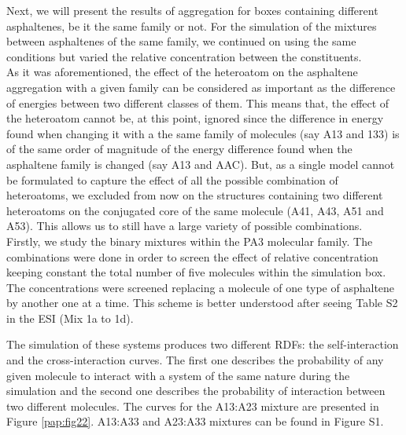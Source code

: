 Next, we will present the results of aggregation for boxes containing different asphaltenes, be it the same family or not. For the simulation of the mixtures between asphaltenes of the same family, we continued on using the same conditions but varied the relative concentration between the constituents.\\

As it was aforementioned, the effect of the heteroatom on the asphaltene aggregation with a given family can be considered as important as the difference of energies between two different classes of them. This means that, the effect of the heteroatom cannot be, at this point, ignored since the difference in energy found when changing it with a the same family of molecules (say A13 and 133) is of the same order of magnitude of the energy difference found when the asphaltene family is changed (say A13 and AAC). But, as a single model cannot be formulated to capture the effect of all the possible combination of heteroatoms, we excluded from now on the structures containing two different heteroatoms on the conjugated core of the same molecule (A41, A43, A51 and A53). This allows us to still have a large variety of possible combinations.\\

Firstly, we study the binary mixtures within the PA3 molecular family. The combinations were done in order to screen the effect of relative concentration keeping constant the total number of five molecules within the simulation box. The concentrations were screened replacing a molecule of one type of asphaltene by another one at a time. This scheme is better understood after seeing Table S2 in the ESI (Mix 1a to 1d).

The simulation of these systems produces two different RDFs: the self-interaction and the cross-interaction curves. The first one describes the probability of any given molecule to interact with a system of the same nature during the simulation and the second one describes the probability of interaction between two different molecules. The curves for the A13:A23 mixture are presented in Figure \ref{pap:fig22}. A13:A33 and A23:A33 mixtures can be found in Figure S1. 

